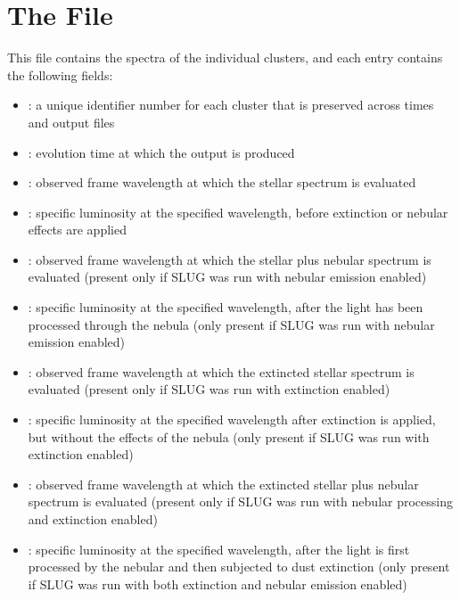 \documentclass[letterpaper,10pt,english]{sphinxmanual}
\begin{document}
\section{The  File}
\label{\detokenize{output:the-cluster-spec-file}}
This file contains the spectra of the individual clusters, and each entry contains the following fields:
\begin{itemize}
\item {} 
: a unique identifier number for each cluster that is preserved across times and output files

\item {} 
: evolution time at which the output is produced

\item {} 
: observed frame wavelength at which the stellar spectrum is evaluated

\item {} 
: specific luminosity at the specified wavelength, before extinction or nebular effects are applied

\item {} 
: observed frame wavelength at which the stellar plus nebular spectrum is evaluated (present only if SLUG was run with nebular emission enabled)

\item {} 
: specific luminosity at the specified wavelength, after the light has been processed through the nebula (only present if SLUG was run with nebular emission enabled)

\item {} 
: observed frame wavelength at which the extincted stellar spectrum is evaluated (present only if SLUG was run with extinction enabled)

\item {} 
: specific luminosity at the specified wavelength after extinction is applied, but without the effects of the nebula (only present if SLUG was run with extinction enabled)

\item {} 
: observed frame wavelength at which the extincted stellar plus nebular spectrum is evaluated (present only if SLUG was run with nebular processing and  extinction enabled)

\item {} 
: specific luminosity at the specified wavelength, after the light is first processed by the nebular and then subjected to dust extinction (only present if SLUG was run with both extinction and nebular emission enabled)

\end{itemize}
\end{document}
